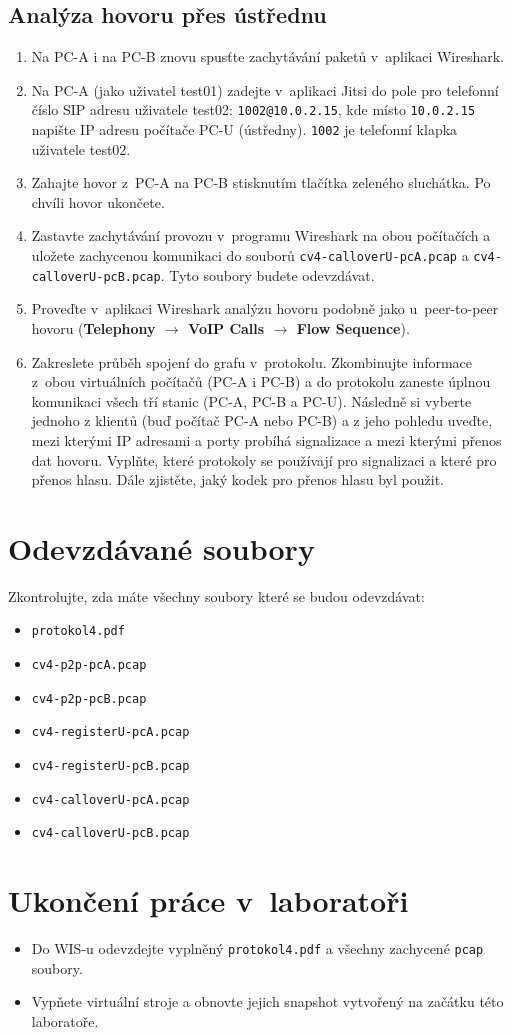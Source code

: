 \subsection{Analýza hovoru přes ústřednu}
\begin{enumerate}
    \item Na PC-A i na PC-B znovu spusťte zachytávání paketů v aplikaci Wireshark.
    \item Na PC-A (jako uživatel test01) zadejte v~aplikaci Jitsi do pole pro telefonní číslo SIP adresu uživatele test02: {\tt 1002@10.0.2.15}, kde místo {\tt 10.0.2.15} napište IP adresu počítače PC-U (ústředny). {\tt 1002} je telefonní klapka uživatele test02.
    \item Zahajte hovor z~PC-A na PC-B stisknutím tlačítka zeleného sluchátka. Po chvíli hovor ukončete.
	\item Zastavte zachytávání provozu v~programu Wireshark na obou počítačích a uložete zachycenou komunikaci do souborů \texttt{cv4-calloverU-pcA.pcap} a \texttt{cv4-calloverU-pcB.pcap}. Tyto soubory budete odevzdávat.
	\item Proveďte v~aplikaci Wireshark analýzu hovoru podobně jako u~peer-to-peer hovoru ({\bf Telephony $\rightarrow$ VoIP Calls $\rightarrow$ \bf Flow Sequence}).
    \item Zakreslete průběh spojení do grafu v~protokolu. Zkombinujte informace z~obou virtuálních počítačů (PC-A i PC-B) a do protokolu zaneste úplnou komunikaci všech
      tří stanic (PC-A, PC-B a PC-U).
	  Následně si vyberte jednoho z klientů (buď počítač PC-A nebo PC-B) a z jeho pohledu uveďte, mezi kterými IP adresami a porty probíhá signalizace a mezi kterými přenos dat hovoru. Vyplňte, které protokoly se používají pro signalizaci a které pro přenos hlasu. Dále zjistěte, jaký kodek pro přenos hlasu byl použit.
\end{enumerate}


\section*{Odevzdávané soubory}
Zkontrolujte, zda máte všechny soubory které se budou odevzdávat:
\begin{itemize}
  \item \texttt{protokol4.pdf}
  \item \texttt{cv4-p2p-pcA.pcap}
  \item \texttt{cv4-p2p-pcB.pcap}
  \item \texttt{cv4-registerU-pcA.pcap}
  \item \texttt{cv4-registerU-pcB.pcap}
  \item \texttt{cv4-calloverU-pcA.pcap}
  \item \texttt{cv4-calloverU-pcB.pcap}
\end{itemize}

\section*{Ukončení práce v~laboratoři}
\begin{itemize}
	\item Do WIS-u odevzdejte vyplněný \texttt{protokol4.pdf} a všechny zachycené \texttt{pcap} soubory.
	\item Vypňete virtuální stroje a obnovte jejich snapshot vytvořený na začátku této laboratoře.
\end{itemize}
